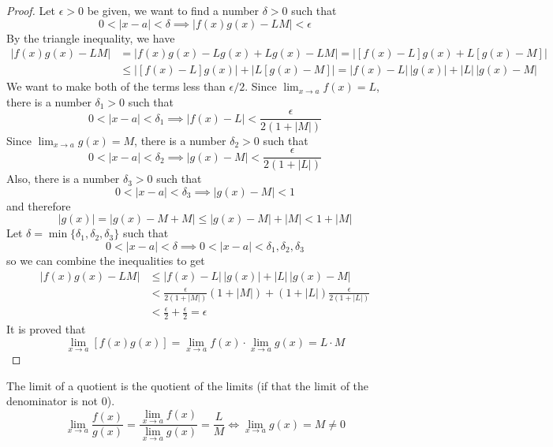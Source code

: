 \begin{proof}
    Let \(\epsilon>0\) be given, we want to find a number \(\delta>0\) such
    that \[0<|x-a|<\delta\implies|f(x)g(x)-LM|<\epsilon\]
    By the triangle inequality, we have
    \begin{align*}
        |f(x)g(x)-LM|&=|f(x)g(x)-Lg(x)+Lg(x)-LM|=|[f(x)-L]g(x)+L[g(x)-M]| \\
        &\leq |[f(x)-L]g(x)|+|L[g(x)-M]|=|f(x)-L|\,|g(x)|+|L|\,|g(x)-M|
    \end{align*}
    We want to make both of the terms less than \(\epsilon/2\).
    Since \(\lim_{x\to a}f(x)=L\), there is a number \(\delta_1>0\) such that
    \[0<|x-a|<\delta_1\implies|f(x)-L|<\frac{\epsilon}{2(1+|M|)}\]
    Since \(\lim_{x\to a}g(x)=M\), there is a number \(\delta_2>0\) such that
    \[0<|x-a|<\delta_2\implies|g(x)-M|<\frac{\epsilon}{2(1+|L|)}\]
    Also, there is a number \(\delta_3>0\) such that
    \[0<|x-a|<\delta_3\implies|g(x)-M|<1\] and therefore
    \[|g(x)|=|g(x)-M+M|\leq|g(x)-M|+|M|<1+|M|\]
    Let \(\delta=\min\{\delta_1,\delta_2,\delta_3\}\) such that
    \[0<|x-a|<\delta\implies0<|x-a|<\delta_1,\delta_2,\delta_3\]
    so we can combine the inequalities to get
    \begin{align*}
        |f(x)g(x)-LM|&\leq|f(x)-L|\,|g(x)|+|L|\,|g(x)-M| \\
        &<\frac{\epsilon}{2(1+|M|)}(1+|M|)+(1+|L|)\frac{\epsilon}{2(1+|L|)} \\
        &<\frac{\epsilon}{2}+\frac{\epsilon}{2}=\epsilon
    \end{align*}
    It is proved that
    \[\lim_{x\to a}[f(x)g(x)]=\lim_{x\to a}f(x)\cdot\lim_{x\to a}g(x)=L\cdot M\]
\end{proof}
\begin{theorem}
    The limit of a quotient is the quotient of the limits (if that the
    limit of the denominator is not 0).
    \[\lim_{x\to a}\frac{f(x)}{g(x)}=\frac{\lim_{x\to a}f(x)}{\lim_{x\to a}g(x)}
    =\frac{L}{M}\iff\lim_{x\to a}g(x)=M\neq0\]
\end{theorem}
